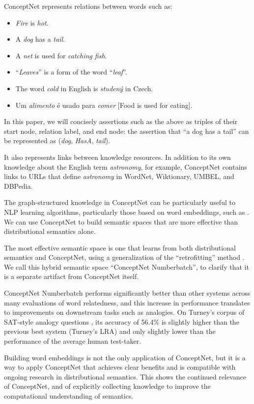\documentclass[letterpaper]{article}
\begin{document}
ConceptNet represents relations between words such as:

\begin{itemize}
    \item \emph{Fire} is \emph{hot}.
    \item A \emph{dog} has a \emph{tail}.
    \item A \emph{net} is used for \emph{catching fish}.
    \item ``\emph{Leaves}'' is a form of the word ``\emph{leaf}''.
    \item The word \emph{cold} in English is \emph{studený} in Czech.
    \item Um \emph{alimento} é usado para \emph{comer} [Food is used for eating].
\end{itemize}

In this paper, we will concisely assertions such as the above as triples of
their start node, relation label, and end node: the assertion that ``a dog has
a tail'' can be represented as (\emph{dog}, \emph{HasA}, \emph{tail}).

It also represents links between knowledge resources. In addition to its own
knowledge about the English term \emph{astronomy}, for example, ConceptNet
contains links to URLs that define \emph{astronomy} in WordNet, Wiktionary,
UMBEL, and DBPedia.

The graph-structured knowledge in ConceptNet can be particularly useful to NLP
learning algorithms, particularly those based on word embeddings, such as
\cite{mikolov2013word2vec}. We can use ConceptNet to build semantic spaces that
are more effective than distributional semantics alone.

The most effective semantic space is one that learns from both distributional
semantics and ConceptNet, using a generalization of the ``retrofitting'' method
\cite{faruqui2015retrofitting}. We call this hybrid semantic space ``ConceptNet
Numberbatch'', to clarify that it is a separate artifact from ConceptNet
itself.

ConceptNet Numberbatch performs significantly better than other systems across
many evaluations of word relatedness, and this increase in performance
translates to improvements on downstream tasks such as analogies.  On Turney's
corpus of SAT-style analogy questions \cite{turney2005lra}, its accuracy of
56.4\% is slightly higher than the previous best system (Turney's LRA) and only
slightly lower than the performance of the average human test-taker.

Building word embeddings is not the only application of ConceptNet, but it is a
way to apply ConceptNet that achieves clear benefits and is compatible with
ongoing research in distributional semantics. This shows the continued relevance of
ConceptNet, and of explicitly collecting knowledge to improve the computational
understanding of semantics.
\end{document}

